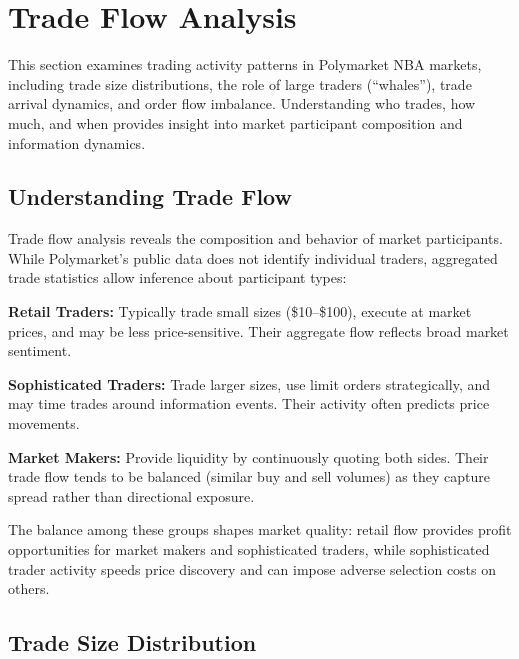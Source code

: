 
\chapter{Trade Flow Analysis}
\label{sec:trade-flow}

This section examines trading activity patterns in Polymarket NBA markets, including trade size distributions, the role of large traders (``whales''), trade arrival dynamics, and order flow imbalance. Understanding who trades, how much, and when provides insight into market participant composition and information dynamics.

\section{Understanding Trade Flow}

Trade flow analysis reveals the composition and behavior of market participants. While Polymarket's public data does not identify individual traders, aggregated trade statistics allow inference about participant types:

\textbf{Retail Traders:} Typically trade small sizes (\$10--\$100), execute at market prices, and may be less price-sensitive. Their aggregate flow reflects broad market sentiment.

\textbf{Sophisticated Traders:} Trade larger sizes, use limit orders strategically, and may time trades around information events. Their activity often predicts price movements.

\textbf{Market Makers:} Provide liquidity by continuously quoting both sides. Their trade flow tends to be balanced (similar buy and sell volumes) as they capture spread rather than directional exposure.

The balance among these groups shapes market quality: retail flow provides profit opportunities for market makers and sophisticated traders, while sophisticated trader activity speeds price discovery and can impose adverse selection costs on others.

\section{Trade Size Distribution}

